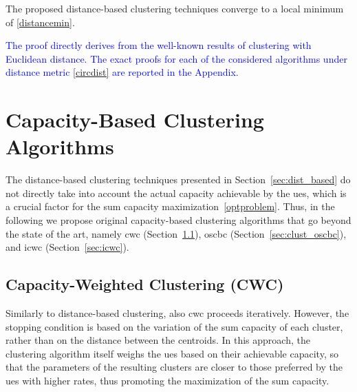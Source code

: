 \begin{theorem}\label{th_distancebased}
    The proposed distance-based clustering techniques converge to a local minimum of \eqref{distancemin}.
\end{theorem}
\begin{IEEEproof}[Proof] 
\textcolor{blue}{The proof directly derives from the well-known results of clustering with Euclidean distance. The exact proofs for each of the considered algorithms under distance metric \eqref{circdist} are reported in the Appendix.}
\end{IEEEproof}

\section{Capacity-Based Clustering Algorithms}
\label{sec:cap_based}
The distance-based clustering techniques presented in Section~\ref{sec:dist_based} do not directly take into account the actual capacity achievable by the \glspl{ue}, which is a crucial factor for the sum capacity maximization~\eqref{optproblem}. Thus, in the following we propose original capacity-based clustering algorithms that go beyond the state of the art, namely \gls{cwc} (Section~\ref{sec:cwc}), \gls{oscbc} (Section~\ref{sec:clust_oscbc}), and \gls{icwc} (Section~\ref{sec:icwc}).

\subsection{Capacity-Weighted Clustering (CWC)}
\label{sec:cwc}

Similarly to distance-based clustering, also \gls{cwc} proceeds iteratively. However, the stopping condition is based on the variation of the sum capacity of each cluster, rather than on the distance between the centroids. 
In this approach, the clustering algorithm itself weighs the \glspl{ue} based on their achievable capacity, so that the parameters of the resulting clusters are closer to those preferred by the \glspl{ue} with higher rates, thus promoting the maximization of the sum capacity.

